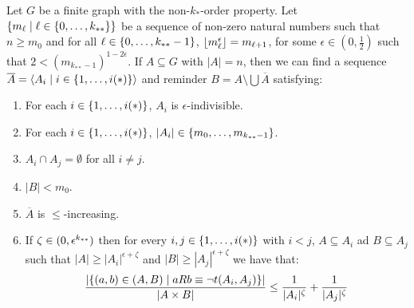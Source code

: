     \begin{lemma}[Claim 4.10] \label{lem:existance_of_ordered_f_indivisible_partitions_with_exceptions_bound}
        Let $G$ be a finite graph with the non-$k_{*}$-order property.
        Let $\{ m_\ell \mid \ell \in \{ 0, \dots, k_{**} \} \}$ be a sequence of non-zero natural numbers such that
        $n \geq m_0$ and for all $\ell \in \{ 0, \dots, k_{**}-1 \}$, $\left\lfloor m_\ell^\epsilon \right\rfloor = m_{\ell+1}$,
        for some $\epsilon \in (0, \frac{1}{2})$ such that $2 < (m_{k_{**}-1})^{1-2\epsilon}$.
        If $A \subseteq G$ with $|A| = n$, then we can find a sequence $\overline{A} = \left< A_i \mid i \in \{ 1, \dots, i(*) \} \right>$
        and reminder $B = A \setminus \bigcup \overline{A}$ satisfying:
        \begin{enumerate}
            \item \label{itm:existance_of_ordered_f_indivisible_partitions_with_exceptions_bound.1} For each $i \in \{ 1, \dots, i(*) \}$, $A_i$ is $\epsilon$-indivisible.
            \item \label{itm:existance_of_ordered_f_indivisible_partitions_with_exceptions_bound.2} For each $i \in \{ 1, \dots, i(*) \}$, $|A_i| \in \{ m_0, \dots, m_{k_{**}-1} \}$.
            \item \label{itm:existance_of_ordered_f_indivisible_partitions_with_exceptions_bound.3} $A_i \cap A_j = \emptyset$ for all $i \neq j$.
            \item \label{itm:existance_of_ordered_f_indivisible_partitions_with_exceptions_bound.4} $|B| < m_0$.
            \item \label{itm:existance_of_ordered_f_indivisible_partitions_with_exceptions_bound.5} $\overline{A}$ is $\leq$-increasing.
            \item \label{itm:existance_of_ordered_f_indivisible_partitions_with_exceptions_bound.6} If $\zeta \in ( 0,\epsilon^{k_{**}} )$ then for every $i,j \in \{ 1, \dots, i(*) \}$ with $i < j$,
                $A \subseteq A_i$ ad $B \subseteq A_j$ such that $|A| \geq |A_i|^{\epsilon + \zeta}$ and $|B| \geq |A_j|^{\epsilon + \zeta}$
                we have that:
                \[
                    \begin{split}
                        \frac{|\parcurly{(a,b) \in (A,B) \mid a R b \equiv \neg t(A_i,A_j)}|}{|A \times B|}
                            &\leq \frac{1}{|A_i|^\zeta} + \frac{1}{|A_j|^\zeta} \\

\end{split}\]
\end{enumerate}
\end{lemma}
